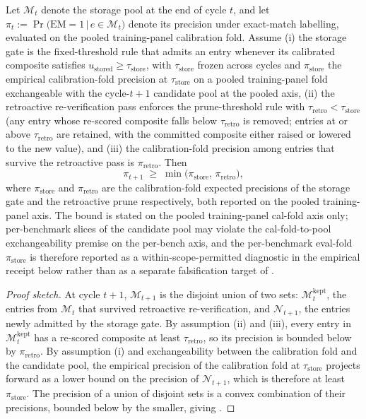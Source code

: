 \begin{theorem}
\label{thm:purity}
Let $\mathcal{M}_{t}$ denote the storage pool at the end of cycle $t$, and let
\(\pi_{t} := \Pr\big(\mathrm{EM}=1 \,\big|\, e \in \mathcal{M}_{t}\big)\)
denote its precision under exact-match labelling, evaluated on the pooled training-panel calibration fold. Assume (i) the storage gate is the fixed-threshold rule that admits an entry whenever its calibrated composite satisfies $u_{\text{stored}} \ge \tau_{\text{store}}$, with $\tau_{\text{store}}$ frozen across cycles and $\pi_{\text{store}}$ the empirical calibration-fold precision at $\tau_{\text{store}}$ on a pooled training-panel fold exchangeable with the cycle-$t+1$ candidate pool at the pooled axis, (ii) the retroactive re-verification pass enforces the prune-threshold rule with $\tau_{\text{retro}} < \tau_{\text{store}}$ (any entry whose re-scored composite falls below $\tau_{\text{retro}}$ is removed; entries at or above $\tau_{\text{retro}}$ are retained, with the committed composite either raised or lowered to the new value), and (iii) the calibration-fold precision among entries that survive the retroactive pass is $\pi_{\text{retro}}$. Then
\begin{equation}
\pi_{t+1} \;\ge\; \min\!\big(\pi_{\text{store}},\,\pi_{\text{retro}}\big),
\label{eq:thm-purity}
\end{equation}
where $\pi_{\text{store}}$ and $\pi_{\text{retro}}$ are the calibration-fold expected precisions of the storage gate and the retroactive prune respectively, both reported on the pooled training-panel axis. The bound is stated on the pooled training-panel cal-fold axis only; per-benchmark slices of the candidate pool may violate the cal-fold-to-pool exchangeability premise on the per-bench axis, and the per-benchmark eval-fold $\pi_{\text{store}}$ is therefore reported as a within-scope-permitted diagnostic in the empirical receipt below rather than as a separate falsification target of .
\end{theorem}

\begin{proof}[Proof sketch]
At cycle $t+1$, $\mathcal{M}_{t+1}$ is the disjoint union of two sets: $\mathcal{M}_{t}^{\text{kept}}$, the entries from $\mathcal{M}_{t}$ that survived retroactive re-verification, and $\mathcal{N}_{t+1}$, the entries newly admitted by the storage gate. By assumption (ii) and (iii), every entry in $\mathcal{M}_{t}^{\text{kept}}$ has a re-scored composite at least $\tau_{\text{retro}}$, so its precision is bounded below by $\pi_{\text{retro}}$. By assumption (i) and exchangeability between the calibration fold and the candidate pool, the empirical precision of the calibration fold at $\tau_{\text{store}}$ projects forward as a lower bound on the precision of $\mathcal{N}_{t+1}$, which is therefore at least $\pi_{\text{store}}$. The precision of a union of disjoint sets is a convex combination of their precisions, bounded below by the smaller, giving .
\end{proof}

